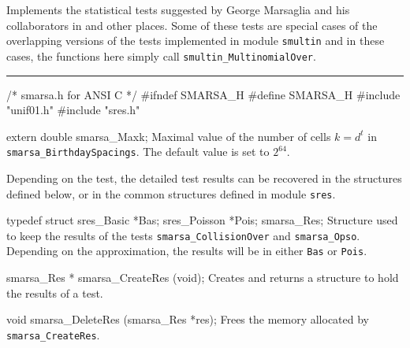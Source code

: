 
Implements the statistical tests suggested by George Marsaglia and his
collaborators in \cite{rMAR85a} and other places.
Some of these tests are special cases of the overlapping versions of the
tests implemented in module {\tt smultin} and in these cases, the
functions here simply call  {\tt smultin\_MultinomialOver}.
\resdef



\iffalse  %
For all these tests, when $N>1$, we may apply a two-level test
over the  $N$ $p$-values obtained at the first level.
For $N=1$, we simply compute the $p$-value of the first level test;
$n$ is the sample size of the first level test.
We also drop the first $r$ bits (the most significant,
$r \ge 0$) of each generated random number and apply the tests on
 the remaining bits.
\fi  %

\bigskip\hrule

\code\hide
/* smarsa.h for ANSI C */
#ifndef SMARSA_H
#define SMARSA_H
\endhide
#include "unif01.h"
#include "sres.h"
\endcode

\ifdetailed  %


\code

extern double smarsa_Maxk;
\endcode
\tab
   Maximal value of the number of cells $k = d^t$ in
   {\tt smarsa\_BirthdaySpacings}.
   The default value is set to $2^{64}$.
\endtab




Depending on the test, the detailed test results can be recovered in the
structures defined below, or in the common structures defined in module
 {\tt sres}.

\code

typedef struct {
   sres_Basic *Bas;
   sres_Poisson *Pois;
} smarsa_Res;
\endcode
 \tab
  Structure used to keep the results of the tests
  {\tt smarsa\_CollisionOver} and  {\tt smarsa\_Opso}.
  Depending on the approximation, the results will be in either {\tt Bas}
  or  {\tt Pois}.
 \endtab
\code


smarsa_Res * smarsa_CreateRes (void);
\endcode
 \tab
  Creates and returns a structure to hold the results of a test.
 \endtab
\code


void smarsa_DeleteRes (smarsa_Res *res);
\endcode
 \tab
  Frees the memory allocated by {\tt smarsa\_CreateRes}.
 \endtab

